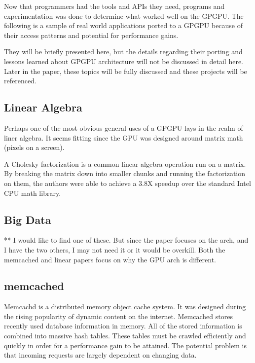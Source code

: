 Now that programmers had the tools and APIs they need, programs and experimentation was done to determine what worked well on the GPGPU. The following is a sample of real world applications ported to a GPGPU because of their access patterns and potential for performance gains. 

They will be briefly presented here, but the details regarding their porting and lessons learned about GPGPU architecture will not be discussed in detail here. Later in the paper, these topics will be fully discussed and these projects will be referenced. 

\subsection*{Linear Algebra}

Perhaps one of the most obvious general uses of a GPGPU lays in the realm of liner algebra. It seems fitting since the GPU was designed around matrix math (pixels on a screen). 

A Cholesky factorization is a common linear algebra operation run on a matrix. By breaking the matrix down into smaller chunks and running the factorization on them, the authors were able to achieve a 3.8X speedup over the standard Intel CPU math library. \cite{linearalg}

\subsection*{Big Data}

** I would like to find one of these. But since the paper focuses on the arch, and I have the two others, I may not need it or it would be overkill. Both the memcached and linear papers focus on why the GPU arch is different. 

\subsection*{memcached}


Memcachd is a distributed memory object cache system. It was designed during the rising popularity of dynamic content on the internet. Memcached stores recently used database information in memory. All of the stored information is combined into massive hash tables. These tables must be crawled efficiently and quickly in order for a performance gain to be attained. The potential problem is that incoming requests are largely dependent on changing data. 

